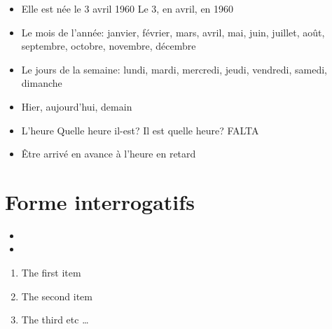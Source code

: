 \documentclass[12pt]{article}  %
\begin{document}
\begin{itemize}
  \item Elle est née le 3 avril 1960  
  	\subitem Le 3, en avril, en 1960
  \item Le mois de l'année:   
  	\subitem janvier, février, mars, avril, mai, juin, juillet, août, septembre, octobre, novembre, décembre
  \item Le jours de la semaine:   
  	\subitem lundi, mardi, mercredi, jeudi, vendredi, samedi, dimanche
  \item Hier, aujourd'hui, demain
  \item L'heure
    \subitem Quelle heure il-est? Il est quelle heure?
    FALTA
  \item Être arrivé
  	\subitem en avance
  	\subitem à l'heure
  	\subitem en retard
\end{itemize}

\section{Forme interrogatifs}

\begin{itemize}
  \item {}
  \item {}
  \subitem
\end{itemize}

\begin{enumerate}
  \item The first item
  \item The second item
  \item The third etc \ldots
\end{enumerate}
\end{document}
